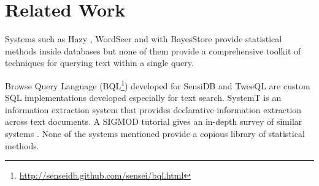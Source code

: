 
\section{Related Work}


Systems such as Hazy \cite{Koc:2011:IMC:1952376.1952380}, 
WordSeer \cite{muralidharanvisual} and with BayesStore \cite{Wang:2008:BML:1453856.1453896} provide statistical 
methods inside databases but none of them provide a 
comprehensive toolkit of techniques for querying text within a single query.


Browse Query Language (BQL\footnote{\url{http://senseidb.github.com/sensei/bql.html}}) developed for SensiDB and 
TweeQL \cite{Marcus:2012:PVD:2094114.2094120} are custom SQL
implementations developed especially for text search.
SystemT is an information extraction system that provides declarative information
extraction across text documents.
A SIGMOD tutorial gives an in-depth survey of similar systems
\cite{Chiticariu:2010:EIE:1807167.1807339}.
None of the systems mentioned provide a copious library of statistical methods.

